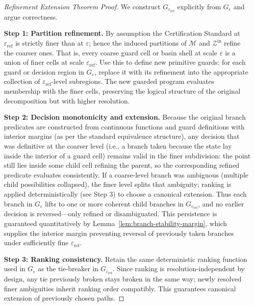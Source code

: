 \documentclass[12pt]{article}
\theoremstyle{definition}
\theoremstyle{plain}
\begin{document}
\begin{proof}[Refinement Extension Theorem Proof]
We construct \(G_{\varepsilon_{\mathrm{ref}}}\) explicitly from \(G_\varepsilon\) and argue correctness.

\textbf{Step 1: Partition refinement.}  
By assumption the Certification Standard at \(\varepsilon_{\mathrm{ref}}\) is strictly finer than at \(\varepsilon\); hence the induced partitions of \(\mathcal M\) and \(\mathcal Z^{\mathrm{in}}\) refine the coarser ones. That is, every coarse guard cell or basin shell at scale \(\varepsilon\) is a union of finer cells at scale \(\varepsilon_{\mathrm{ref}}\). Use this to define new primitive guards: for each guard or decision region in \(G_\varepsilon\), replace it with its refinement into the appropriate collection of \(\varepsilon_{\mathrm{ref}}\)-level subregions. The new guarded program evaluates membership with the finer cells, preserving the logical structure of the original decomposition but with higher resolution.

\textbf{Step 2: Decision monotonicity and extension.}  
Because the original branch predicates are constructed from continuous functions and guard definitions with interior margins (as per the standard equivalence structure), any decision that was definitive at the coarser level (i.e., a branch taken because the state lay inside the interior of a guard cell) remains valid in the finer subdivision: the point still lies inside some child cell refining the parent, so the corresponding refined predicate evaluates consistently. If a coarse-level branch was ambiguous (multiple child possibilities collapsed), the finer level splits that ambiguity; ranking is applied deterministically (see Step 3) to choose a canonical extension. Thus each branch in \(G_\varepsilon\) lifts to one or more coherent child branches in \(G_{\varepsilon_{\mathrm{ref}}}\), and no earlier decision is reversed—only refined or disambiguated. This persistence is guaranteed quantitatively by Lemma~\ref{lem:branch-stability-margin}, which supplies the interior margin preventing reversal of previously taken branches under sufficiently fine \(\varepsilon_{\mathrm{ref}}\).


\textbf{Step 3: Ranking consistency.}  
Retain the same deterministic ranking function used in \(G_\varepsilon\) as the tie-breaker in \(G_{\varepsilon_{\mathrm{ref}}}\). Since ranking is resolution-independent by design, any tie previously broken stays broken in the same way; newly resolved finer ambiguities inherit ranking order compatibly. This guarantees canonical extension of previously chosen paths.


\end{proof}
\end{document}
